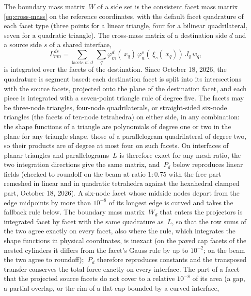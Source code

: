 \documentclass[11pt]{article}
\begin{document}
The boundary mass matrix $~W$ of a side set is the consistent facet mass
matrix \eqref{eq:cross-mass} on the reference coordinates, with the
default facet quadrature of each facet type (three points for a linear
triangle, four for a bilinear quadrilateral, seven for a quadratic
triangle). The cross-mass matrix of a destination side $d$ and a source
side $s$ of a shared interface,
\begin{equation}
  L^{d s}_{mn} = \sum_{\text{facets of } d}\ \sum_{q}
    \varphi^d_m(~x_q)\, \varphi^s_n(~\xi_s(~x_q))\, J_q\, w_q ,
  \label{eq:cross-dst}
\end{equation}
is integrated over the facets of the destination. Since October 18, 2026,
the quadrature is segment based: each destination facet is split into its
intersections with the source facets, projected onto the plane of the
destination facet, and each piece is integrated with a seven-point
triangle rule of degree five. The facets may be three-node triangles,
four-node quadrilaterals, or straight-sided six-node triangles (the facets
of ten-node tetrahedra) on either side, in any combination: the shape
functions of a triangle are polynomials of degree one or two in the plane
for any triangle shape, those of a parallelogram quadrilateral of degree
two, so their products are of degree at most four on such facets. On
interfaces of planar triangles and parallelograms $~L$ is therefore exact
for any mesh ratio, the two integration directions give the same matrix,
and $~P_d$ below reproduces linear fields (checked to roundoff on the beam
at ratio $1{:}0.75$ with the free part remeshed in linear and in quadratic
tetrahedra against the hexahedral clamped part, October 18, 2026). A
six-node facet whose midside nodes depart from the edge midpoints by more
than $10^{-8}$ of its longest edge is curved and takes the fallback rule
below. The boundary
mass matrix $~W_d$ that enters the projectors is integrated facet by facet
with the same quadrature as $~L$, so that the row sums of the two agree
exactly on every facet, also where the rule, which integrates the shape
functions in physical coordinates, is inexact (on the paved cap facets of
the nested cylinders it differs from the facet's Gauss rule by up to
$10^{-2}$; on the beam the two agree to roundoff); $~P_d$ therefore
reproduces constants and the transposed transfer conserves the total force
exactly on every interface. The part of a facet that the projected
source facets do not cover to a relative $10^{-8}$ of its area (a gap, a
partial overlap, or the rim of a flat cap bounded by a curved interface,
\end{document}

